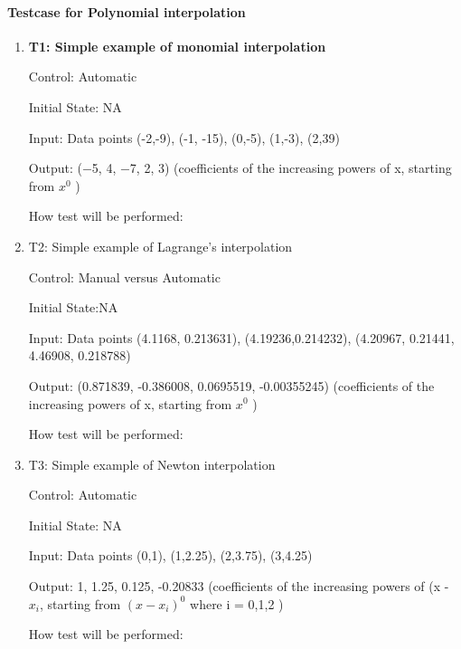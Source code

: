 \documentclass[12pt, titlepage]{article}
\begin{document}
\paragraph{Testcase for Polynomial interpolation}

\begin{enumerate}

\item{\textbf{T1: Simple example of monomial interpolation} \\}

Control: Automatic 
					
Initial State: NA
					
Input: Data points (-2,-9), (-1, -15), (0,-5), (1,-3), (2,39)
					
Output: (−5, 4, −7, 2, 3) (coefficients of the increasing powers of x, starting from $x^{0}$ )
					
How test will be performed: 


					
\item{T2: Simple example of Lagrange's interpolation \\}

Control: Manual versus Automatic
					
Initial State:NA 
					
Input: Data points (4.1168, 0.213631), (4.19236,0.214232), (4.20967, 0.21441, 4.46908, 0.218788)
					
Output: (0.871839, -0.386008, 0.0695519, -0.00355245) (coefficients of the increasing powers of x, starting from $x^{0}$ )
					
How test will be performed: 


\item{T3: Simple example of Newton interpolation \\}

Control: Automatic 

Initial State: NA

Input: Data points (0,1), (1,2.25), (2,3.75), (3,4.25)

Output: 1, 1.25, 0.125, -0.20833 (coefficients of the increasing powers of (x - $x_i$, starting from $(x - x_i)^{0}$ where i = 0,1,2 )

How test will be performed: 




\end{enumerate}
\end{document}
